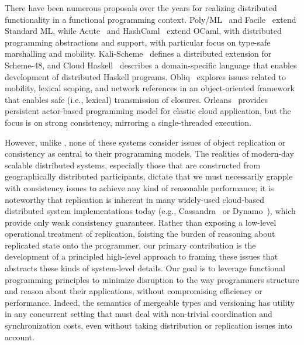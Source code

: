 There have been numerous proposals over the years for realizing distributed
functionality in a functional programming context. Poly/ML~\cite{Mat97} and
Facile~\cite{TLK+93} extend Standard ML, while Acute~\cite{SLW+05} and
HashCaml~\cite{BSS+06} extend OCaml, with distributed programming abstractions
and support, with particular focus on type-safe marshalling and mobility.
Kali-Scheme~\cite{CJK95} defines a distributed extension for Scheme-48, and
Cloud Haskell~\cite{EBPJ11} describes a domain-specific language that enables
development of distributed Haskell programs. Obliq~\cite{Car95} explores issues
related to mobility, lexical scoping, and network references in an
object-oriented framework that enables safe (i.e., lexical) transmission of
closures. Orleans~\cite{Orleans} provides persistent actor-based programming
model for elastic cloud application, but the focus is on strong consistency,
mirroring a single-threaded execution.

However, unlike \name, none of these systems consider issues of object
replication or consistency as central to their programming models. The
realities of modern-day scalable distributed systems, especially those that are
constructed from geographically distributed participants, dictate that we must
necessarily grapple with consistency issues to achieve any kind of reasonable
performance; it is noteworthy that replication is inherent in many widely-used
cloud-based distributed system implementations today (e.g.,
Cassandra~\cite{Cassandra} or Dynamo~\cite{Dynamo}), which provide only weak
consistency guarantees.  Rather than exposing a low-level operational treatment
of replication, foisting the burden of reasoning about replicated state onto
the programmer, our primary contribution is the development of a principled
high-level approach to framing these issues that abstracts these kinds of
system-level details.  Our goal is to leverage functional programming
principles to minimize disruption to the way programmers structure and reason
about their applications, without compromising efficiency or performance.
Indeed, the semantics of mergeable types and versioning has utility in any
concurrent setting that must deal with non-trivial coordination and
synchronization costs, even without taking distribution or replication issues
into account.

